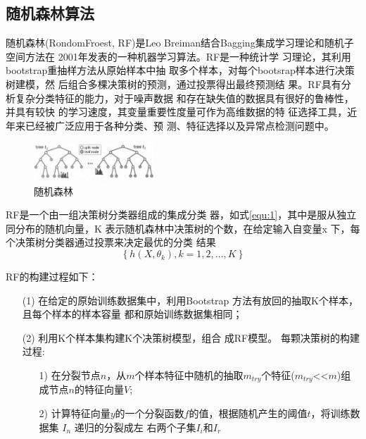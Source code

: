 \documentclass[UTF8,a4paper,10pt,nocolorlinks]{ctexart}
\begin{document}
\begin{multicols}{2}
    \subsection{随机森林算法}
    随机森林(RondomFroest, RF)是Leo Breiman结合Bagging集成学习理论和随机子空间方法在
    2001年发表的一种机器学习算法。RF是一种统计学
    习理论，其利用bootstrap重抽样方法从原始样本中抽
    取多个样本，对每个bootsrap样本进行决策树建模，然
    后组合多棵决策树的预测，通过投票得出最终预测结
    果。RF具有分析复杂分类特征的能力，对于噪声数据
    和存在缺失值的数据具有很好的鲁棒性，并具有较快
    的学习速度，其变量重要性度量可作为高维数据的特
    征选择工具，近年来已经被广泛应用于各种分类、预
    测、特征选择以及异常点检测问题中。\par
    \begin{figure}[H]
        \centering %
        \includegraphics[width=0.4\textwidth]{pictures/RF.png} 
        \caption{随机森林}
        \label{fig:FR}
    \end{figure}
    RF是一个由一组决策树分类器组成的集成分类
    器，如式\ref{equ:1}，其中是服从独立同分布的随机向量，K
    表示随机森林中决策树的个数，在给定输入自变量x
    下，每个决策树分类器通过投票来决定最优的分类
    结果
    \begin{equation} %
        \left\{ h(X, \theta_{k}) , k = 1, 2, \dots, K \right\}
        \label{equ:1}
    \end{equation}
    \par RF的构建过程如下：
    \begin{itemize}
        \item[(1)]在给定的原始训练数据集中，利用Bootstrap
        方法有放回的抽取K个样本，且每个样本的样本容量
        都和原始训练数据集相同；
        \item[(2)]利用K个样本集构建K个决策树模型，组合
        成RF模型。
        每颗决策树的构建过程:
            \begin{itemize}
                \item[1)] 在分裂节点$n$，从$m$个样本特征中随机的抽取$m_{try}$个特征($m_{try}$<<$m$)组成节点$n$的特征向量$V$;
                \item[2)] 计算特征向量$y$的一个分裂函数$f$的值，根据随机产生的阈值$t$，将训练数据集 $I_{n}$ 递归的分裂成左
            右两个子集$I_{i}$和$I_{r}$
                \begin{align}

\end{align}
\end{itemize}
\end{itemize}
\end{multicols}
\end{document}
